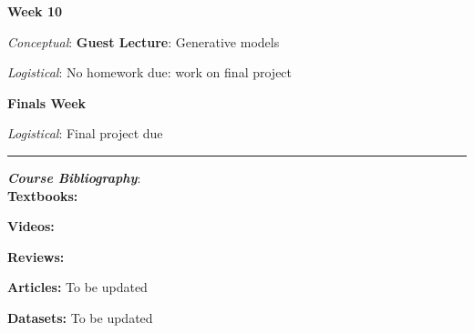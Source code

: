\documentclass[12pt]{article}
\begin{document}
\textbf{Week 10}

\emph{Conceptual}: \textbf{Guest Lecture}: Generative models

\emph{Logistical}: No homework due: work on final project

\textbf{Finals Week}

\emph{Logistical}: Final project due

\begin{center}
	\rule{\textwidth}{0.5pt}
\end{center}

\noindent\textbf{\emph{Course Bibliography}}:\\

\textbf{Textbooks:}

\newrefsection
\nocite{Mehta:2019,Abu-Mostafa:2012,Erdman:2021,Zeljko:2014,Chollet:2021,Calafiura:2022}
\printbibliography[heading=none]

\textbf{Videos:}

\newrefsection
\nocite{3blue1brown_neuralnetwork,3blue1brown_gradientdescent}
\printbibliography[heading=none]

\textbf{Reviews:}

\newrefsection
\nocite{Carleo:2019ptp}
\printbibliography[heading=none]

\textbf{Articles:} {\color{Orange} To be updated}

\newrefsection
\nocite{deOliveira:2015xxd,Aurisano:2016jvx,Komiske:2016rsd,Khan:2018opv,Zhou:2019,Moreno:2019neq,Ormiston:2020ele,Moreno:2021fvp}
\printbibliography[heading=none]

\textbf{Datasets:} {\color{Orange} To be updated}

\newrefsection
\nocite{hbb_dataset}
\printbibliography[heading=none]
\end{document}
